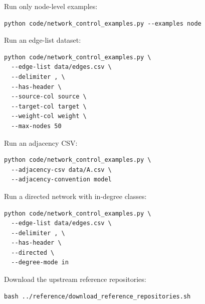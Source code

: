 \documentclass[11pt,a4paper]{article}
\begin{document}
Run only node-level examples:

\begin{lstlisting}[style=bash]
python code/network_control_examples.py --examples node
\end{lstlisting}

Run an edge-list dataset:

\begin{lstlisting}[style=bash]
python code/network_control_examples.py \
  --edge-list data/edges.csv \
  --delimiter , \
  --has-header \
  --source-col source \
  --target-col target \
  --weight-col weight \
  --max-nodes 50
\end{lstlisting}

Run an adjacency CSV:

\begin{lstlisting}[style=bash]
python code/network_control_examples.py \
  --adjacency-csv data/A.csv \
  --adjacency-convention model
\end{lstlisting}

Run a directed network with in-degree classes:

\begin{lstlisting}[style=bash]
python code/network_control_examples.py \
  --edge-list data/edges.csv \
  --delimiter , \
  --has-header \
  --directed \
  --degree-mode in
\end{lstlisting}

Download the upstream reference repositories:

\begin{lstlisting}[style=bash]
bash ../reference/download_reference_repositories.sh
\end{lstlisting}
\end{document}
